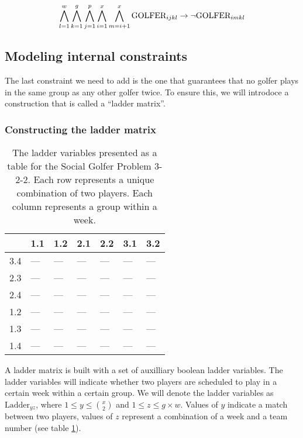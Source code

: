 \documentclass[a4paper]{scrartcl}
\begin{document}
\begin{equation}
\centering
    \bigwedge \limits_{l=1}^w 
    \bigwedge \limits_{k=1}^g 
    \bigwedge \limits_{j=1}^p
    \bigwedge \limits_{i=1}^x 
    \bigwedge \limits_{m=i+1}^x 
    \text{GOLFER}_{ijkl} 
    \to
    \neg \text{GOLFER}_{imkl}
\end{equation}


\subsection{Modeling internal constraints}

The last constraint we need to add is the one that guarantees that no golfer plays in the same group as any other golfer twice. To ensure this, we will introdoce a construction that is called a ``ladder matrix''.


\subsubsection{Constructing the ladder matrix}

\begin{table}[h]
\centering
\label{ladder:example}
\begin{tabular}{ l | l | l | l | l | l | l }

    & 1.1 & 1.2 & 2.1 & 2.2 & 3.1 & 3.2 \\
\hline
3.4 & --- & --- & --- & --- & --- & --- \\
2.3 & --- & --- & --- & --- & --- & --- \\
2.4 & --- & --- & --- & --- & --- & --- \\
1.2 & --- & --- & --- & --- & --- & --- \\
1.3 & --- & --- & --- & --- & --- & --- \\
1.4 & --- & --- & --- & --- & --- & --- \\

\end{tabular}
\caption{The ladder variables presented as a table for the Social Golfer Problem 3-2-2. Each row represents a unique combination of two players. Each column represents a group within a week.}
\end{table}

A ladder matrix is built with a set of auxilliary boolean ladder variables. The ladder variables will indicate whether two players are scheduled to play in a certain week within a certain group. We will denote the ladder variables as $\text{Ladder}_{yz}$, where $1 \leq y \leq {x \choose 2}$ and $1 \leq z \leq g \times w$. Values of $y$ indicate a match between two players, values of $z$ represent a combination of a week and a team number (see table \ref{ladder:example}). 
\end{document}
